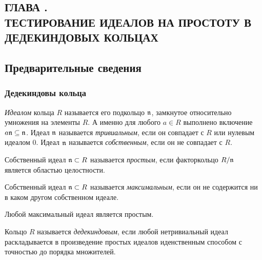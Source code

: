 \documentclass[_00_dissertation.tex]{subfiles}
\begin{document}
\onlyinsubfile{
    \renewcommand{\contentsname}{ОГЛАВЛЕНИЕ}
    \setcounter{tocdepth}{3}
    \tableofcontents
}

\begin{center}
    \chapter*{ГЛАВА .\\ ТЕСТИРОВАНИЕ ИДЕАЛОВ НА ПРОСТОТУ В ДЕДЕКИНДОВЫХ КОЛЬЦАХ}\label{chapter:Primality}
\end{center}

\section{Предварительные сведения}

\subsection{Дедекиндовы кольца}

\begin{definition}
    \emph{Идеалом} кольца $R$ называется его подкольцо $\mathfrak{n}$, замкнутое относительно умножения на элементы $R$.
    А именно для любого $a \in R$ выполнено включение $a\mathfrak{n} \subseteq \mathfrak{n}$.
    Идеал $\mathfrak{n}$ называется \emph{тривиальным}, если он совпадает с $R$ или нулевым идеалом $0$.
    Идеал $\mathfrak{n}$ называется \emph{собственным}, если он не совпадает с $R$.
\end{definition}

\begin{definition}
    Собственный идеал $\mathfrak{n} \subset R$ называется \emph{простым}, если факторкольцо $R/\mathfrak{n}$ является областью целостности.
\end{definition}

\begin{definition}
    Собственный идеал $\mathfrak{n} \subset R$ называется \emph{максимальным}, если он не содержится ни в каком другом собственном идеале.
\end{definition}

\begin{remark}
    Любой максимальный идеал является простым.
\end{remark}

\begin{definition}
    Кольцо $R$ называется \emph{дедекиндовым}, если любой нетривиальный идеал раскладывается в произведение простых идеалов иденственным способом с точностью до порядка множителей.
\end{definition}
\end{document}
